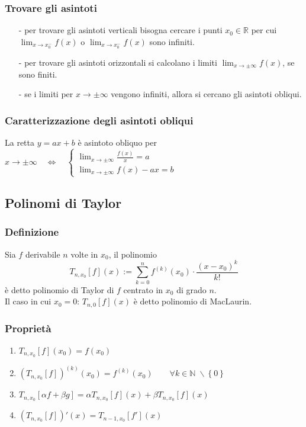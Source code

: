\documentclass[a4paper]{article}
\begin{document}
\subsubsection*{Trovare gli asintoti}
\begin{itemize}
	\item[-] per trovare gli asintoti verticali bisogna cercare i punti \(x_0 \in \mathbb{R}\) per cui \(\displaystyle \lim_{x \to x_0^-} f(x)\) o
	\(\)\(\displaystyle \lim_{x \to x_0^-} f(x)\) sono infiniti.
	\item[-] per trovare gli asintoti orizzontali si calcolano i limiti \(\displaystyle \lim_{x \to \pm \infty} f(x)\), se sono finiti.
	\item[-] se i limiti per \(x \to \pm \infty\) vengono infiniti, allora si cercano gli asintoti obliqui.
\end{itemize}

\subsubsection*{Caratterizzazione degli asintoti obliqui}
La retta \(y = ax + b\) è asintoto obliquo per \(x \to \pm \infty \quad \Leftrightarrow \quad \begin{cases}
	\displaystyle \lim_{x \to \pm \infty} \frac{f(x)}{x} = a \\
	\displaystyle \lim_{x \to \pm \infty} f(x) - ax = b
\end{cases}\)

\newpage


\subsection{Polinomi di Taylor}
\subsubsection*{Definizione}
Sia \(f\) derivabile \(n\) volte in \(x_0\), il polinomio
\[T_{n,x_0}[f](x) := \sum_{k = 0}^{n} f^{(k)}(x_0) \cdot \frac{(x-x_0)^k}{k!}\]
è detto polinomio di Taylor di \(f\) centrato in \(x_0\) di grado \(n\). \\
Il caso in cui \(x_0 = 0\): \(\displaystyle T_{n,0}[f](x)\) è detto polinomio di MacLaurin.

\subsubsection*{Proprietà}
\begin{enumerate}
	\item \(T_{n,x_0}[f](x_0) = f(x_0)\)
	\item \(\left(T_{n,x_0}[f]\right)^{(k)}(x_0) = f^{(k)}(x_0) \qquad \forall k \in \mathbb{N} \; \backslash \left\{0\right\}\)
	\item \(T_{n,x_0}[\alpha f + \beta g] = \alpha T_{n,x_0}[f](x) + \beta T_{n,x_0}[f](x)\)
	\item \(\left(T_{n,x_0}[f]\right)'(x) = T_{n-1,x_0}[f'](x)\)
\end{enumerate}
\end{document}
